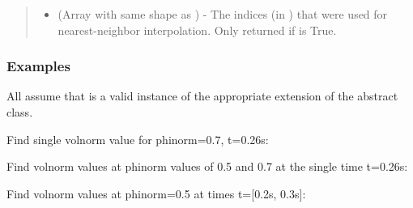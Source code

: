 \documentclass[letterpaper,10pt,english]{sphinxmanual}
\begin{document}
\begin{fulllineitems}
\begin{fulllineitems}
\begin{quote}
\begin{description}
\begin{itemize}
\item {} 
 (Array with same shape as ) - The indices
(in ) that were used for
nearest-neighbor interpolation. Only returned if  is
True.

\end{itemize}


\end{description}\end{quote}
\subsubsection*{Examples}

All assume that  is a valid instance of the appropriate
extension of the {\hyperref[\detokenize{eqtools:eqtools.core.Equilibrium}]{}} abstract class.

Find single volnorm value for phinorm=0.7, t=0.26s:

\begin{sphinxVerbatim}[commandchars=\\\{\}]
   
\end{sphinxVerbatim}

Find volnorm values at phinorm values of 0.5 and 0.7 at the single time
t=0.26s:

\begin{sphinxVerbatim}[commandchars=\\\{\}]
  \PYG{p}{[} \PYG{p}{]} 
\end{sphinxVerbatim}

Find volnorm values at phinorm=0.5 at times t={[}0.2s, 0.3s{]}:

\begin{sphinxVerbatim}[commandchars=\\\{\}]
   \PYG{p}{[} \PYG{p}{]}
\end{sphinxVerbatim}


\end{fulllineitems}
\end{fulllineitems}
\end{document}
